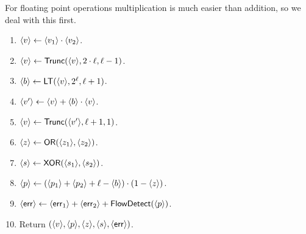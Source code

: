 For floating point operations multiplication is much easier than addition, so we deal with 
this first.
\begin{enumerate}
\item $\langle v \rangle \leftarrow \langle v_1 \rangle \cdot \langle v_2 \rangle$.
\item $\langle v \rangle \leftarrow \mathsf{Trunc}(\langle v \rangle,2 \cdot \ell, \ell-1)$.
\item $\langle b \rangle \leftarrow \mathsf{LT}(\langle v \rangle,2^\ell,\ell+1)$.
\item $\langle v' \rangle \leftarrow \langle v \rangle+\langle b \rangle \cdot \langle v \rangle$.
\item $\langle v \rangle \leftarrow \mathsf{Trunc}(\langle v' \rangle, \ell+1, 1)$.
\item $\langle z \rangle \leftarrow \mathsf{OR}(\langle z_1 \rangle,\langle z_2 \rangle)$.
\item $\langle s \rangle \leftarrow \mathsf{XOR}(\langle s_1 \rangle,\langle s_2 \rangle)$.
\item $\langle p \rangle \leftarrow (\langle p_1 \rangle+\langle p_2 \rangle+\ell-\langle b \rangle) \cdot (1-\langle z \rangle)$.
\item $\langle \mathsf{err} \rangle \leftarrow \langle \mathsf{err}_1 \rangle + \langle \mathsf{err}_2 \rangle + \mathsf{FlowDetect}(\langle p \rangle)$.
\item Return $(\langle v \rangle,\langle p \rangle,\langle z \rangle,\langle s \rangle,\langle \mathsf{err} \rangle)$.
\end{enumerate}


